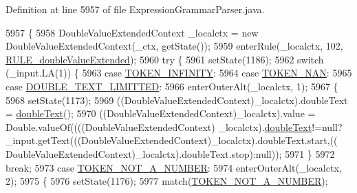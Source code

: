 Definition at line 5957 of file Expression\+Grammar\+Parser.\+java.


\begin{DoxyCode}
5957                                                                                             \{
5958     DoubleValueExtendedContext \_localctx = \textcolor{keyword}{new} DoubleValueExtendedContext(\_ctx, getState());
5959     enterRule(\_localctx, 102, \hyperlink{classgov_1_1nasa_1_1jpf_1_1inspector_1_1server_1_1expression_1_1parser_1_1_expression_grammar_parser_a2894a880588876977c9a53fd38cfa1c2}{RULE\_doubleValueExtended});
5960     \textcolor{keywordflow}{try} \{
5961       setState(1186);
5962       \textcolor{keywordflow}{switch} (\_input.LA(1)) \{
5963       \textcolor{keywordflow}{case} \hyperlink{classgov_1_1nasa_1_1jpf_1_1inspector_1_1server_1_1expression_1_1parser_1_1_expression_grammar_parser_a981860bd0826a8bf3fa1b9201956e0a4}{TOKEN\_INFINITY}:
5964       \textcolor{keywordflow}{case} \hyperlink{classgov_1_1nasa_1_1jpf_1_1inspector_1_1server_1_1expression_1_1parser_1_1_expression_grammar_parser_a8069c6fb9d6a244bd45f047b6fb7e735}{TOKEN\_NAN}:
5965       \textcolor{keywordflow}{case} \hyperlink{classgov_1_1nasa_1_1jpf_1_1inspector_1_1server_1_1expression_1_1parser_1_1_expression_grammar_parser_a68673c70894625a52edf0c22579e7f01}{DOUBLE\_TEXT\_LIMITTED}:
5966         enterOuterAlt(\_localctx, 1);
5967         \{
5968         setState(1173);
5969         ((DoubleValueExtendedContext)\_localctx).doubleText = \hyperlink{classgov_1_1nasa_1_1jpf_1_1inspector_1_1server_1_1expression_1_1parser_1_1_expression_grammar_parser_a3795d0b45018e075565149ff89fe27f6}{doubleText}();
5970          ((DoubleValueExtendedContext)\_localctx).value =  Double.valueOf((((DoubleValueExtendedContext)
      \_localctx).\hyperlink{classgov_1_1nasa_1_1jpf_1_1inspector_1_1server_1_1expression_1_1parser_1_1_expression_grammar_parser_a3795d0b45018e075565149ff89fe27f6}{doubleText}!=null?\_input.getText(((DoubleValueExtendedContext)\_localctx).doubleText.start,((
      DoubleValueExtendedContext)\_localctx).doubleText.stop):null)); 
5971         \}
5972         \textcolor{keywordflow}{break};
5973       \textcolor{keywordflow}{case} \hyperlink{classgov_1_1nasa_1_1jpf_1_1inspector_1_1server_1_1expression_1_1parser_1_1_expression_grammar_parser_a76c92660cd85fa75e4f84293b7d2f9e1}{TOKEN\_NOT\_A\_NUMBER}:
5974         enterOuterAlt(\_localctx, 2);
5975         \{
5976         setState(1176);
5977         match(\hyperlink{classgov_1_1nasa_1_1jpf_1_1inspector_1_1server_1_1expression_1_1parser_1_1_expression_grammar_parser_a76c92660cd85fa75e4f84293b7d2f9e1}{TOKEN\_NOT\_A\_NUMBER});

\end{DoxyCode}
